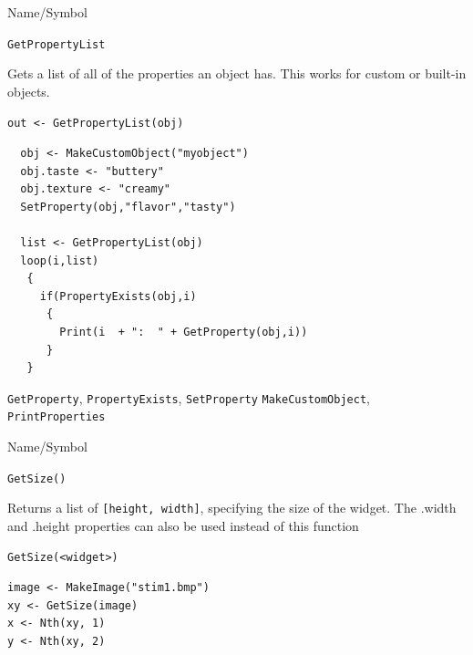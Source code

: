 \begin{desc}{Name/Symbol}
\item[Name/Symbol] \verb+GetPropertyList+ 

\item[Description]  
Gets a list of all of the properties an object has.  This works for custom or built-in objects.
  
\item[Usage]       
     \verb+out <- GetPropertyList(obj)+ 
\item[Example]

\begin{verbatim}
  obj <- MakeCustomObject("myobject")
  obj.taste <- "buttery"
  obj.texture <- "creamy"
  SetProperty(obj,"flavor","tasty")
  
  list <- GetPropertyList(obj)
  loop(i,list)
   {
     if(PropertyExists(obj,i)
      {
        Print(i  + ":  " + GetProperty(obj,i))
      }
   }

\end{verbatim}


\item[See Also]
\verb+GetProperty+, \verb+PropertyExists+, \verb+SetProperty+ \verb+MakeCustomObject+, \verb+PrintProperties+ 
\end{desc} 



\begin{desc}{Name/Symbol}
\item[Name/Symbol]	\verb+GetSize()+

\item[Description] Returns a list of \verb+[height, width]+,
  specifying the size of the widget.
  The .width and .height properties can also be used instead of this function

\item[Usage]
\begin{verbatim}
GetSize(<widget>)
\end{verbatim}

\item[Example]
\begin{verbatim}
image <- MakeImage("stim1.bmp")
xy <- GetSize(image)
x <- Nth(xy, 1)
y <- Nth(xy, 2)
\end{verbatim}

\item[See Also]	
\end{desc}

